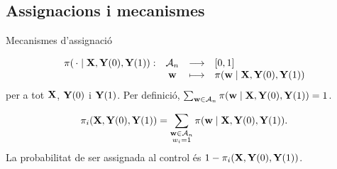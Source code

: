 \documentclass{bestbeamer}
\begin{document}
\subsection{Assignacions i mecanismes}
\begin{frame}{Mecanismes d'assignació}\label{frame:mecassignacio}
\small
\begin{definition}\label{def:mecanisme-assignacio}
\vspace{-4mm}
\[
 \begin{array}{cccl}
 \pi(\,\cdot\mid\mathbf{X},\mathbf{Y}(0),\mathbf{Y}(1)): & \mathcal A_n & \longrightarrow & [0,1] \\
 & \mathbf{w} & \longmapsto & \pi(\mathbf{w}\mid \mathbf{X},\mathbf{Y}(0),\mathbf{Y}(1))
 \end{array}
\]
per a tot $\mathbf{X}$, $\mathbf{Y}(0)$ i $\mathbf{Y}(1)$. Per definició, $\sum_{\mathbf{w}\in\mathcal A_n} \pi(\mathbf{w}\mid \mathbf{X},\mathbf{Y}(0),\mathbf{Y}(1))=1$.
\end{definition}
\begin{definition}
\[
\pi_i(\mathbf{X},\mathbf{Y}(0),\mathbf{Y}(1))=\sum_{\substack{\mathbf{w}\in\mathcal A_n\\ w_i=1}}\pi(\mathbf{w}\mid \mathbf{X},\mathbf{Y}(0),\mathbf{Y}(1)).
\]
La probabilitat de ser assignada al control és $1-\pi_i(\mathbf{X},\mathbf{Y}(0),\mathbf{Y}(1))$.
\end{definition}
\end{frame}
\end{document}
